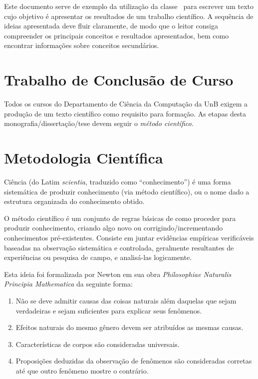 Este documento serve de exemplo da utilização da classe \unbcic\ para escrever 
um texto cujo objetivo é apresentar os resultados de um trabalho científico. A 
sequência de ideias apresentada deve fluir claramente, de modo que o leitor 
consiga compreender os principais conceitos e resultados apresentados, bem como 
encontrar informações sobre conceitos secundários.


\section{Trabalho de Conclusão de Curso}%
Todos os cursos do Departamento de Ciência da Computação da UnB exigem a produção de um
texto científico como requisito para formação. %
As etapas desta monografia/dissertação/tese devem seguir o \emph{método científico}.

\section{Metodologia Científica}%
Ciência (do Latim \emph{scientia}, traduzido como ``conhecimento'') é uma forma 
sistemática de produzir conhecimento (via método científico), ou o nome dado a 
estrutura organizada do conhecimento obtido.

O método científico é um conjunto de regras básicas de como proceder para produzir 
conhecimento, criando algo novo ou corrigindo/incrementando conhecimentos 
pré-existentes. Consiste em juntar evidências empíricas verificáveis baseadas na 
observação sistemática e controlada, geralmente resultantes de experiências ou 
pesquisa de campo, e analisá-las logicamente. 

Esta ideia foi formalizada por Newton em sua obra \emph{Philosophiae Naturalis 
Principia Mathematica} \cite{newton1833philosophiae} da seguinte forma:
\begin{enumerate}
	\item Não se deve admitir causas das coisas naturais além daquelas 
	que sejam verdadeiras e sejam suficientes para explicar seus fenômenos.
	\item Efeitos naturais do mesmo gênero devem ser atribuídos as mesmas causas.
	\item Características de corpos são consideradas universais.
	\item Proposições deduzidas da observação de fenômenos são 
	consideradas corretas até que outro fenômeno mostre o contrário.
\end{enumerate}%

